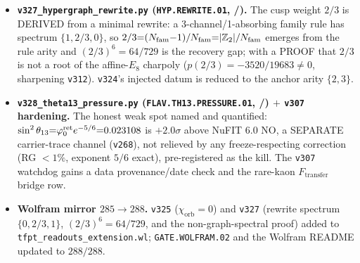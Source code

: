 \begin{itemize}
  Only $F_{\mathrm{pole}}$ carries the seam rate; the four external rates are honestly fenced (\texttt{v187}/\texttt{v303}).
\item \textbf{\texttt{v327\_hypergraph\_rewrite.py} (\texttt{HYP.REWRITE.01}, \mE/\mO).} The cusp weight $2/3$ is
  DERIVED from a minimal rewrite: a 3-channel/1-absorbing family rule has spectrum $\{1,2/3,0\}$, so
  $2/3{=}(N_{\mathrm{fam}}{-}1)/N_{\mathrm{fam}}{=}|\mathbb{Z}_2|/N_{\mathrm{fam}}$ emerges from the rule arity and $(2/3)^6{=}64/729$ is the recovery gap;
  with a PROOF that $2/3$ is not a root of the affine-$E_8$ charpoly ($p(2/3){=}-3520/19683\ne0$, sharpening \texttt{v312}).
  \texttt{v324}'s injected datum is reduced to the anchor arity $\{2,3\}$.
\item \textbf{\texttt{v328\_theta13\_pressure.py} (\texttt{FLAV.TH13.PRESSURE.01}, \mC/\mX) $+$ \texttt{v307}
  hardening.} The honest weak spot named and quantified: $\sin^2\theta_{13}{=}\varphi_0^{\mathrm{ret}} e^{-5/6}{=}0.023108$ is
  $+2.0\sigma$ above NuFIT 6.0 NO, a SEPARATE carrier-trace channel (\texttt{v268}), not relieved by any
  freeze-respecting correction (RG $<1\%$, exponent $5/6$ exact), pre-registered as the kill.  The \texttt{v307}
  watchdog gains a data provenance/date check and the rare-kaon $F_{\mathrm{transfer}}$ bridge row.
\item \textbf{Wolfram mirror $285\to288$.} \texttt{v325} ($\chi_{\mathrm{orb}}{=}0$) and \texttt{v327} (rewrite
  spectrum $\{0,2/3,1\}$, $(2/3)^6{=}64/729$, and the non-graph-spectral proof) added to
  \texttt{tfpt\_readouts\_extension.wl}; \texttt{GATE.WOLFRAM.02} and the Wolfram README updated to $288/288$.
\end{itemize}

